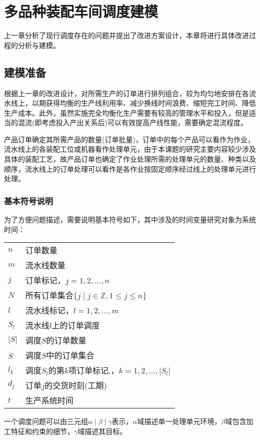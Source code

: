 \chapter{多品种装配车间调度建模}
上一章分析了现行调度存在的问题并提出了改进方案设计，本章将进行具体改进过程的分析与建模。

\section{建模准备}

根据上一章的改进设计，对所需生产的订单进行排列组合，较为均匀地安排在各流水线上，以期获得均衡的生产线利用率、减少换线时间浪费、缩短完工时间、降低生产成本。此外，虽然实施完全均衡化生产需要有较高的管理水平和投入，但是适当的混流(即考虑投入产出关系后)可以有效提高产线性能，需要确定混流程度。

产品订单确定其所需产品的数量(订单批量)，订单中的每个产品可以看作为作业，流水线上的各装配工位或机器看作处理单元，由于本课题的研究主要内容较少涉及具体的装配工艺，故产品订单也确定了作业处理所需的处理单元的数量、种类以及顺序，流水线上的订单处理可以看作是各作业按固定顺序经过线上的处理单元进行处理。

\subsection{基本符号说明}
为了方便问题描述，需要说明基本符号如下，其中涉及的时间变量研究对象为系统时间：\\[3pt]
\begin{supertabular}{ll}
$n$ & 订单数量\\
$m$ & 流水线数量\\
$j$ & 订单标记，$j = 1,2,...,n$\\
$N$ & 所有订单集合$\{ j\mid j \in \mathbb{Z}, 1\le j \le n  \}$\\
$l$ & 流水线标记，$l = 1,2,...,m$\\
$S_l$ & 流水线$l$上的订单调度\\
$|S|$ & 调度$S$的订单数量\\
$\overline S$ & 调度$S$中的订单集合\\
$l_k$ & 调度$S_l$的第$k$项订单标记,，$k = 1,2,...,|S_l|$\\
$d_j$ & 订单$j$的交货时刻(工期)\\
$t$ & 生产系统时间\\[3pt]
\end{supertabular}

一个调度问题可以由三元组$\alpha \mid \beta \mid \gamma$表示，$\alpha$域描述单一处理单元环境，$\beta$域包含加工特征和约束的细节，$\gamma$域描述其目标\cite{pinedo}。

